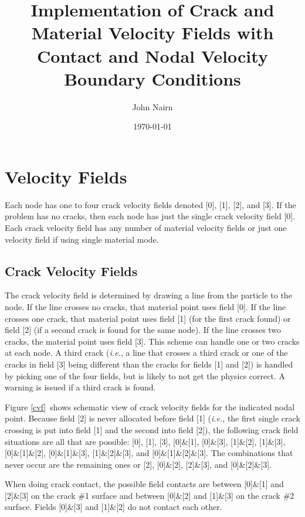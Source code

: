 \documentclass[11pt]{article}
\title{Implementation of Crack and Material Velocity Fields with Contact and Nodal Velocity Boundary Conditions}
\author{John Nairn}
\date{\today}
\begin{document}
\maketitle

\section{Velocity Fields}

Each node has one to four crack velocity fields denoted [0], [1], [2], and [3]. If the problem has no cracks, then each node has just the single crack velocity field [0]. Each crack velocity field has any number of material velocity fields or just one velocity field if using single material mode.

\subsection{Crack Velocity Fields}

The crack velocity field is determined by drawing a line from the particle to the node. If the line crosses no cracks, that material point uses field [0]. If the line crosses one crack, that material point uses field [1] (for the first crack found) or field [2] (if a second crack is found for the same node). If the line crosses two cracks, the material point uses field [3]. This scheme can handle one or two cracks at each node. A third crack ({\em i.e.}, a line that crosses a third crack or one of the cracks in field [3] being different than the cracks for fields [1] and [2]) is handled by picking one of the four fields, but is likely to not get the physics correct. A warning is issued if a third crack is found.

Figure \ref{cvf}\ shows schematic view of crack velocity fields for the indicated nodal point. Because field [2] is never allocated before field [1] ({\em i.e.}, the first single crack crossing is put into field [1] and the second into field [2]), the following crack field situations are all that are possible: [0], [1], [3], [0]\&[1], [0]\&[3], [1]\&[2], [1]\&[3], [0]\&[1]\&[2], [0]\&[1]\&[3], [1]\&[2]\&[3], and [0]\&[1]\&[2]\&[3]. The combinations that never occur are the remaining ones or [2], [0]\&[2], [2]\&[3], and [0]\&[2]\&[3].

When doing crack contact, the possible field contacts are between [0]\&[1] and [2]\&[3] on the crack \#1 surface and between [0]\&[2] and [1]\&[3] on the crack \#2 surface. Fields [0]\&[3] and [1]\&[2] do not contact each other.
\end{document}
